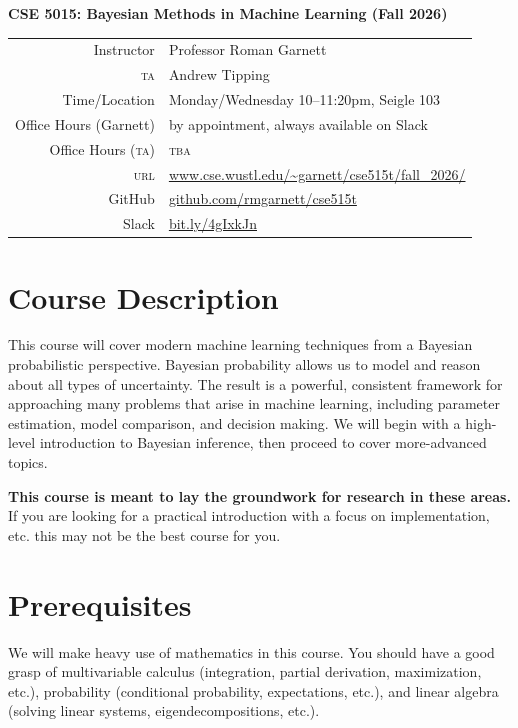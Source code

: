 \documentclass{article}
\newcommand{\acro}[1]{\textsc{\MakeLowercase{#1}}}
\begin{document}
{\large \textbf{CSE 5015: Bayesian Methods in Machine Learning (Fall 2026)}} \\[1ex]

\begin{tabular}{rl}
               Instructor & Professor Roman Garnett                                 \\
                \acro{TA} & Andrew Tipping                                          \\
            Time/Location & Monday/Wednesday 10--11:20pm, Seigle 103                \\
   Office Hours (Garnett) & by appointment, always available on Slack               \\
 Office Hours (\acro{TA}) & \acro{TBA}                                              \\
               \acro{URL} & \url{www.cse.wustl.edu/~garnett/cse515t/fall_2026/}     \\
                   GitHub & \url{github.com/rmgarnett/cse515t}                      \\
     Slack & \url{bit.ly/4gIxkJn}
\end{tabular}

\section*{Course Description}

This course will cover modern machine learning techniques from a Bayesian
probabilistic perspective. Bayesian probability allows us to model and reason
about all types of uncertainty. The result is a powerful, consistent framework
for approaching many problems that arise in machine learning, including
parameter estimation, model comparison, and decision making. We will begin with
a high-level introduction to Bayesian inference, then proceed to cover
more-advanced topics.

\textbf{This course is meant to lay the groundwork for research in these
areas.} If you are looking for a practical introduction with a focus on
implementation, etc. this may not be the best course for you.

\section*{Prerequisites}

We will make heavy use of mathematics in this course.  You should have a good
grasp of multivariable calculus (integration, partial derivation, maximization,
etc.), probability (conditional probability, expectations, etc.), and linear
algebra (solving linear systems, eigendecompositions, etc.).
\end{document}
